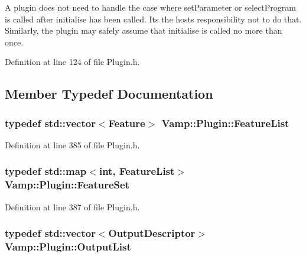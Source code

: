 A plugin does not need to handle the case where set\+Parameter or select\+Program is called after initialise has been called. It\textquotesingle{}s the host\textquotesingle{}s responsibility not to do that. Similarly, the plugin may safely assume that initialise is called no more than once. 

Definition at line 124 of file Plugin.\+h.



\subsection{Member Typedef Documentation}
\subsubsection[{\texorpdfstring{Feature\+List}{FeatureList}}]{\setlength{\rightskip}{0pt plus 5cm}typedef std\+::vector$<${\bf Feature}$>$ {\bf Vamp\+::\+Plugin\+::\+Feature\+List}}\hypertarget{class_vamp_1_1_plugin_a0730bc72c87fa02eb8d2854b233f7be1}{}\label{class_vamp_1_1_plugin_a0730bc72c87fa02eb8d2854b233f7be1}


Definition at line 385 of file Plugin.\+h.

\subsubsection[{\texorpdfstring{Feature\+Set}{FeatureSet}}]{\setlength{\rightskip}{0pt plus 5cm}typedef {\bf std\+::map}$<${\bf int}, {\bf Feature\+List}$>$ {\bf Vamp\+::\+Plugin\+::\+Feature\+Set}}\hypertarget{class_vamp_1_1_plugin_a448fb57dc245d47923ec9eeaf9856c5f}{}\label{class_vamp_1_1_plugin_a448fb57dc245d47923ec9eeaf9856c5f}


Definition at line 387 of file Plugin.\+h.

\subsubsection[{\texorpdfstring{Output\+List}{OutputList}}]{\setlength{\rightskip}{0pt plus 5cm}typedef std\+::vector$<${\bf Output\+Descriptor}$>$ {\bf Vamp\+::\+Plugin\+::\+Output\+List}}\hypertarget{class_vamp_1_1_plugin_a30f531b8fb69fac41a24e3d2a6a08ed9}{}\label{class_vamp_1_1_plugin_a30f531b8fb69fac41a24e3d2a6a08ed9}


